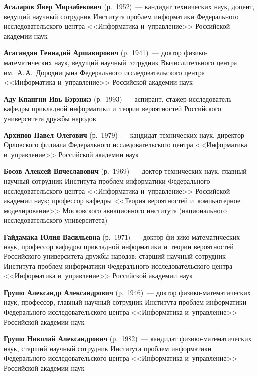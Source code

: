 \begin{multicols}{2}


\noindent
\textbf{Агаларов Явер Мирзабекович} (р.\ 1952)~--- 
кандидат технических наук, доцент, ведущий научный сотрудник Института проб\-лем информатики Федерального исследовательского цент\-ра 
<<Информатика и~управ\-ле\-ние>> Российской академии наук



\noindent
\textbf{Агасандян Геннадий Аршавирович} (р.\ 1941)~--- доктор фи\-зи\-ко-ма\-те\-ма\-ти\-че\-ских наук,
 ведущий научный сотрудник Вы\-чис\-ли\-тель\-но\-го центра им.\ А.\,А.~Дородницына Федерального исследовательского цент\-ра 
 <<Информатика и~управ\-ле\-ние>> Российской академии наук
 
\noindent
\textbf{Аду Кпангни Ивь Бэрэнжэ} (р.\ 1993)~--- аспирант, ста\-жер-ис\-сле\-до\-ва\-тель ка\-фед\-ры 
при\-клад\-ной информатики и~тео\-рии вероятностей Российского университета друж\-бы народов
 
\noindent
\textbf{Архипов Павел Олегович} (р.\ 1979)~--- 
кандидат технических наук, директор Орловского филиала Федерального исследовательского цент\-ра <<Информатика и~управ\-ле\-ние>> Российской академии наук

\noindent
\textbf{Босов Алексей Вячеславович} (р.\ 1969)~--- 
доктор технических наук, главный научный сотрудник Института проб\-лем 
информатики Федерального исследовательского цент\-ра <<Информатика и~управ\-ле\-ние>>
 Российской академии наук; профессор ка\-фед\-ры <<Тео\-рия вероятностей и~компьютерное моделирование>>
  Московского авиационного института (национального исследовательского университета)
  
\noindent
\textbf{Гайдамака Юлия Васильевна} (р.\ 1971)~--- доктор фи-\linebreak зи\-ко-ма\-те\-ма\-ти\-че\-ских наук, 
профессор ка\-фед\-ры при\-клад\-ной информатики и~тео\-рии 
вероятностей Российского университета друж\-бы народов; 
старший научный сотрудник Института проб\-лем информатики Федерального исследовательского цент\-ра 
<<Информатика и~управ\-ле\-ние>> Российской академии наук
  
\noindent
\textbf{Грушо Александр Александрович} (р.\ 1946)~--- доктор фи\-зи\-ко-ма\-те\-ма\-ти\-че\-ских наук, 
профессор, главный научный сотрудник Института проб\-лем информатики Федерального исследовательского цент\-ра 
<<Информатика и~управ\-ле\-ние>> Российской академии наук
  
\noindent
\textbf{Грушо Николай Александрович} (р.\ 1982)~--- кандидат фи\-зи\-ко-ма\-те\-ма\-ти\-че\-ских наук, 
старший научный со\-труд\-ник Института проб\-лем информатики Федерального исследовательского цент\-ра 
<<Информатика и~управ\-ле\-ние>> Российской академии наук
 

\end{multicols}
